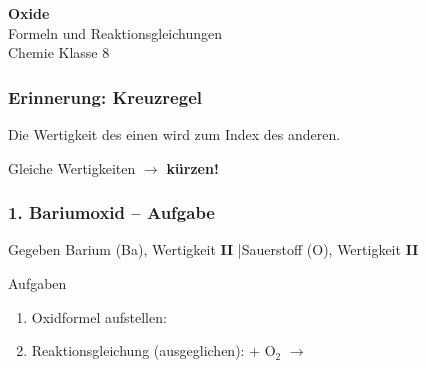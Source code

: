 \documentclass[aspectratio=169, 12pt]{beamer}
\newcommand{\luecke}{\underline{\hspace{2.5cm}}}
\begin{document}

\begin{frame}
\begin{center}
\vspace{1.5cm}
{\Huge\bfseries\textcolor{chemie}{Oxide}}\\[1cm]
{\Large Formeln und Reaktionsgleichungen}\\[1.5cm]
{Chemie Klasse 8}
\end{center}
\end{frame}


\begin{frame}
\frametitle{Erinnerung: Kreuzregel}
\begin{center}
{\large Die Wertigkeit des einen wird zum Index des anderen.}
\vspace{0.8cm}


\vspace{0.8cm}
{\large Gleiche Wertigkeiten $\rightarrow$ \textbf{kürzen!}}
\end{center}
\end{frame}


\begin{frame}
\frametitle{1. Bariumoxid – Aufgabe}
\begin{block}{Gegeben}
Barium (Ba), Wertigkeit \textbf{II} \quad|\quad Sauerstoff (O), Wertigkeit \textbf{II}
\end{block}
\vspace{0.5cm}
\begin{block}{Aufgaben}
\begin{enumerate}
\item Oxidformel aufstellen: \luecke
\item Reaktionsgleichung (ausgeglichen): \quad \luecke{} + O$_2$ $\rightarrow$ \luecke
\end{enumerate}
\end{block}
\end{frame}
\end{document}
